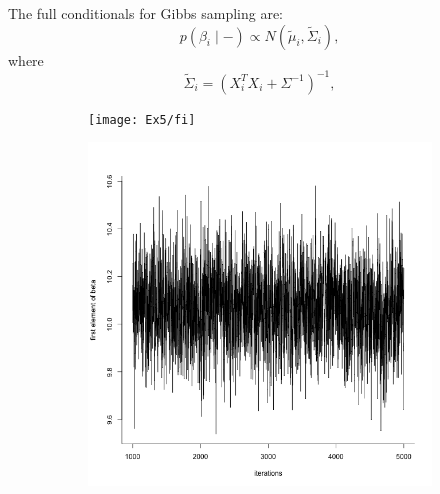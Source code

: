 \documentclass[11pt]{article}
\begin{document}
The full conditionals for Gibbs sampling are:
$$p(\beta_i \mid - ) \propto N(\tilde{\mu}_i, \tilde{\Sigma}_i),$$
where
$$\tilde{\Sigma}_i = (X_i^TX_i + \Sigma^{-1})^{-1},$$

\begin{figure}
    \centering
    \begin{subfigure}[t]{0.5\textwidth}
        \centering
        \texttt{[image: Ex5/fi]} 
    \end{subfigure}
    \hfill
    \begin{subfigure}[t]{0.5\textwidth}
        \centering
        \includegraphics[width=\linewidth]{Ex5/figures/tra_beta.png} 
    \end{subfigure}


\end{figure}
\end{document}
